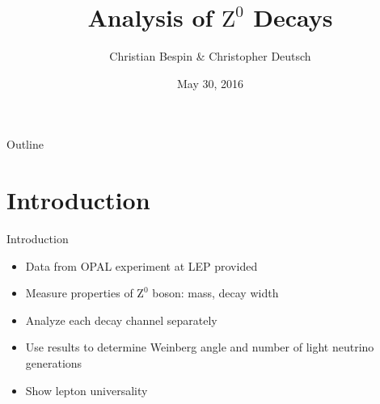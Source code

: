 \documentclass[11pt,xcolor=dvipsnames,professionalfonts]{beamer}
\author[Christian Bespin \& Christopher Deutsch]
{Christian Bespin \& Christopher Deutsch}
\title
{Analysis of $\mathrm{Z}^0$ Decays}
\subtitle
{}
\institute[]
{Advanced Laboratory Course\\ Summer Term 16}
\date{May 30, 2016}
\begin{document}
\maketitle


\begin{frame}{Outline}
	\tableofcontents
\end{frame}

\section{Introduction}
\begin{frame}{Introduction}
		\begin{itemize}
			\setlength\itemsep{1em}
			\item Data from OPAL experiment at LEP provided
			\item Measure properties of $\mathrm{Z}^0$ boson: mass, decay width
			\item Analyze each decay channel separately
			\item Use results to determine Weinberg angle and number of light neutrino generations
			\item Show lepton universality
		\end{itemize}
\end{frame}
\end{document}
